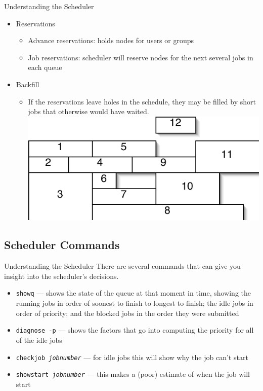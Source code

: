 \documentclass[handout]{beamer}
\begin{document}
\begin{frame}{Understanding the Scheduler}
  \begin{itemize}
  \item<1-> Reservations
    \begin{itemize}
    \item<1-> Advance reservations: holds nodes for users or groups
    \item<1-> Job reservations: scheduler will reserve nodes for the next
several jobs in each queue
    \end{itemize}
  \item<2-> Backfill
    \begin{itemize}
    \item<2-> If the reservations leave holes in the schedule, they may be
filled by short jobs that otherwise would have waited.\\
	\includegraphics{job-grid}
    \end{itemize}
  \end{itemize}
\end{frame}
\subsection{Scheduler Commands}
\begin{frame}{Understanding the Scheduler}
There are several commands that can give you insight into the scheduler's
decisions.
\begin{itemize}
\item \texttt{showq} --- shows the state of the queue at that moment in time,
showing the running jobs in order of soonest to finish to longest to finish; the
idle jobs in order of priority; and the blocked jobs in the order they were
submitted
\item \texttt{diagnose -p} --- shows the factors that go into computing the
priority for all of the idle jobs
\item \texttt{checkjob \textit{jobnumber}} --- for idle jobs this will show why
the job can't start
\item \texttt{showstart \textit{jobnumber}} --- this makes a (poor) estimate of
when the job will start
\end{itemize}
\end{frame}
\end{document}
